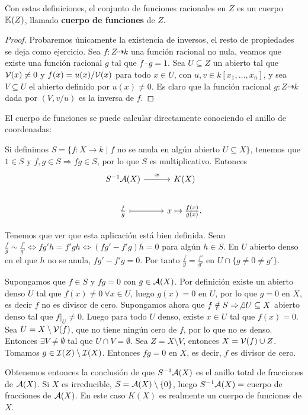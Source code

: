 \documentclass[ACGA.tex]{subfiles}
\begin{document}
\begin{prop}
 Con estas definiciones, el conjunto de funciones racionales en $Z$ es un cuerpo $\mathbb{K}(Z)$, llamado {\bf cuerpo de funciones} de $Z$.
\end{prop}

\begin{proof}
 Probaremos únicamente la existencia de inversos, el resto de propiedades se deja como ejercicio. Sea $f:Z\dashrightarrow k$ una función racional no nula, veamos que existe una función racional $g$ tal que $f\cdot g=1$. Sea $U\subseteq Z$ un abierto tal que $\mathcal{V}(x)\neq 0$ y $f(x)=u(x)/\mathcal{V}(x)$ para todo $x\in U$, con $u,v\in k[x_1,\ldots,x_n]$, y sea $V\subseteq U$ el abierto definido por $u(x)\neq 0$. Es claro que la función racional $g:Z\dashrightarrow k$ dada por $(V,v/u)$ es la inversa de $f$.  
\end{proof}


El cuerpo de funciones se puede calcular directamente conociendo el anillo de coordenadas:

Si definimos $S=\{f:X\to k\mid f$ no se anula en algún abierto $U\subseteq X\}$, tenemos que $1\in S$ y $f,g\in S\Rightarrow fg\in S$, por lo que $S$ es multiplicativo. Entonces 
\[
\begin{tikzcd}
S^{-1}\calA(X)\arrow[r,"\cong"] & K(X)\\
\frac{f}{g}\arrow[r,mapsto] & x\mapsto\frac{f(x)}{g(x)}.
\end{tikzcd}
\]

Tenemos que ver que esta aplicación está bien definida. Sean $\frac{f}{g}\sim\frac{f'}{g'}\Leftrightarrow fg'h=f'gh\Leftrightarrow (fg'-f'g)h=0$ para algún $h\in S$. En $U$ abierto denso en el que $h$ no se anula, $fg'-f'g=0$. Por tanto $\frac{f}{g}=\frac{f'}{g'}$ en $U\cap\{g\neq 0\neq g'\}$. 

Supongamos que $f\in S$ y $fg=0$ con $g\in\mathcal{A}(X)$. Por definición existe un abierto denso $U$ tal que $f(x)\neq 0\ \forall x\in U$, luego $g(x)=0$ en $U$, por lo que $g=0$ en $X$, es decir $f$ no es divisor de cero. Supongamos ahora que $f\notin S\Rightarrow\not\exists U\subseteq X$ abierto denso tal que $f|_U\neq 0$. Luego para todo $U$ denso, existe $x\in U$ tal que $f(x)=0$. Sea $U=X\setminus\mathcal{V}(f)$, que no tiene ningún cero de $f$, por lo que no es denso. Entonces $\exists V\neq\emptyset$ tal que $U\cap V=\emptyset$. Sea $Z=X\setminus V$, entonces $X=\mathcal{V}(f)\cup Z$. Tomamos $g\in\mathcal{I}(Z)\setminus\mathcal{I}(X)$. Entonces $fg=0$ en $X$, es decir, $f$ es divisor de cero.

Obtenemos entonces la conclusión de que $S^{-1}\mathcal{A}(X)$ es el anillo total de fracciones de $\mathcal{A}(X)$. Si $X$ es irreducible, $S=\mathcal{A}(X)\setminus\{0\}$, luego $S^{-1}\mathcal{A}(X)=$ cuerpo de fracciones de $\mathcal{A}(X)$. En este caso $K(X)$ es realmente un cuerpo de funciones de $X$.
\end{document}
